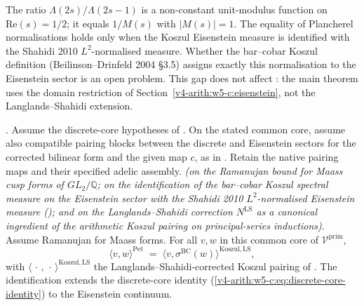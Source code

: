 \begin{remark}
\label{v4-arith:w5-c:rem:LS-gap}
The ratio \(\Lambda(2s)/\Lambda(2s-1)\) is a non-constant unit-modulus function
on \(\mathrm{Re}(s)=1/2\); it equals \(1/M(s)\) with \(|M(s)|=1\).
The equality of Plancherel normalisations holds only when the Koszul
Eisenstein measure is identified with the Shahidi 2010
\(L^{2}\)-normalised measure. Whether the bar--cobar Koszul definition
(Beilinson--Drinfeld 2004 \S3.5) assigns exactly this normalisation to
the Eisenstein sector is an open problem. This gap does not affect
: the main theorem uses the domain
restriction of Section~\ref{v4-arith:w5-c:eisenstein}, not the
Langlands--Shahidi extension.
\end{remark}

\begin{theorem}
\label{v4-arith:w5-c:thm:full-vprim-LS}
\ClaimStatusProvedHereConditional. Assume the discrete-core hypotheses
of . On the stated
common core, assume also compatible pairing blocks between the
discrete and Eisenstein sectors for the corrected bilinear form
and the given map $c$, as in
.
Retain the native pairing maps and their specified adelic assembly.
\emph{(on the Ramanujan bound for Maass cusp
forms of \(GL_{2}/\mathbb{Q}\); on the identification of the bar--cobar
Koszul spectral measure on the Eisenstein sector with the Shahidi 2010
\(L^{2}\)-normalised Eisenstein measure
(); and on the Langlands--Shahidi
correction \(N^{\mathrm{LS}}\) as a canonical ingredient of the arithmetic
Koszul pairing on principal-series inductions)}. Assume Ramanujan for
Maass forms. For all $v,w$ in this common core of
$\mathcal V^{\mathrm{prim}}$,
\begin{equation}
\label{v4-arith:w5-c:eq:full-vprim-LS}
\langle v,w\rangle^{\mathrm{Pet}}
\;=\;\langle v,\sigma^{\mathrm{BC}}(w)\rangle^{\mathrm{Koszul},\mathrm{LS}},
\end{equation}
with \(\langle\,\cdot\,,\,\cdot\,\rangle^{\mathrm{Koszul},\mathrm{LS}}\)
the Langlands--Shahidi-corrected Koszul pairing of
. The identification extends
the discrete-core identity
(\ref{v4-arith:w5-c:eq:discrete-core-identity}) to the Eisenstein
continuum.
\end{theorem}

